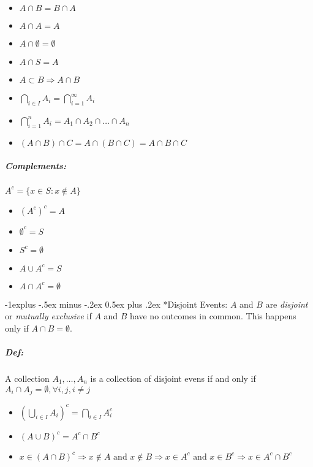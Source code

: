 \documentclass[landscape,10pt]{article}
\makeatletter
\renewcommand{\subsection}{\@startsection{subsection}{2}{0mm}%
                                {-1explus -.5ex minus -.2ex}%
                                {0.5ex plus .2ex}%
                                {\normalfont\normalsize\bfseries}}
\makeatother
\begin{document}
\begin{multicols}{3}
            \begin{itemize}
                \item[] \(A \cap B = B \cap A \)
                \item[] \(A \cap A = A \)
                \item[] \(A \cap \emptyset = \emptyset \)
                \item[] \(A \cap S = A\)
                \item[] \(A \subset B \Rightarrow A \cap B\)
                \item[] \(\bigcap\limits_{i\in I}A_i = \bigcap\limits_{i=1}^{\infty}A_i\)
                \item[] \(\bigcap\limits_{i=1}^{n}A_i = A_1 \cap A_2 \cap \dots \cap A_n \)
                \item[] \( (A \cap B) \cap C = A \cap (B \cap C) = A \cap B \cap C\)
            \end{itemize}
        
        \subparagraph*{Complements: } 
            \(A^c = \{x \in S: x \notin A\}\)
            
            \begin{itemize}
                \item[] \((A^c)^c = A\)
                \item[] \(\emptyset^c = S\)
                \item[] \(S^c = \emptyset\)
                \item[] \(A\cup A^c = S\)
                \item[] \(A \cap A^c = \emptyset\)
            \end{itemize}
    
    \subsection*{Disjoint Events: } 
        $A$ and $B$ are \textit{disjoint} or \textit{mutually exclusive} if $A$ and $B$ have no outcomes in common. This happens only if \(A \cap B = \emptyset \).
        
        \subparagraph*{Def:} 
            A collection \(A_1, \dots, A_n\) is a collection of disjoint evens if and only if \(A_i \cap A_j = \emptyset, \forall i, j, i \neq j\)
            
            \begin{itemize}
                \item[] \(\left (\bigcup\limits_{i\in I} A_i \right)^c = \bigcap\limits_{i\in I}A_i^c \)
                \item[] \((A\cup B)^c = A^c \cap B^c \)
                \item[] \(x\in(A\cap B)^c 
                \Rightarrow x \notin A \text{ and } x\notin B 
                \Rightarrow x \in A^c \text{ and } x \in B^c 
                \Rightarrow x \in A^c \cap B^c \)
            \end{itemize}


\end{multicols}
\end{document}
